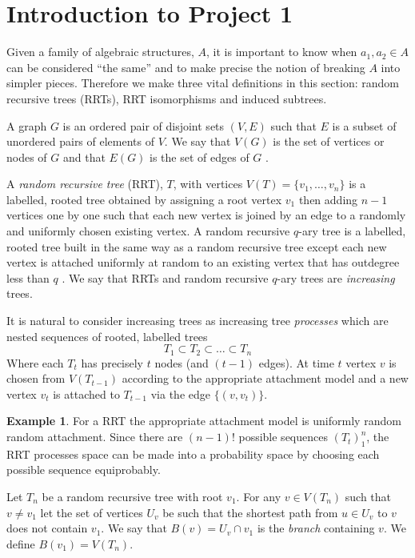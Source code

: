 \documentclass[12pt]{article} %
\theoremstyle{definition}
\newtheorem{ex}[thm]{Example}
\begin{document}
\section{Introduction to Project 1}\label{aut}

Given a family of algebraic structures, $A$, it is important to know when $a_{1},a_{2} \in A$ can be considered ``the same'' and to make precise the notion of breaking $A$ into simpler pieces. Therefore we make three vital definitions in this section: random recursive trees (RRTs), RRT isomorphisms and induced subtrees. 

A graph $G$ is an ordered pair of disjoint sets $(V,E)$ such that $E$ is a subset of unordered pairs of elements of $V$. We say that $V(G)$ is the set of vertices or nodes of $G$ and that $E(G)$ is the set of edges of $G$ \cite{Bela}.
 
A \emph{random recursive tree} (RRT), $T$, with vertices $V(T) = \{v_{1},\dots,v_{n}\}$ is a labelled, rooted tree obtained by assigning a root vertex $v_{1}$ then adding $n-1$ vertices one by one such that each new vertex is joined by an edge to a randomly and uniformly chosen existing vertex. A random recursive $q$-ary tree is a labelled, rooted tree built in the same way as a random recursive tree except each new vertex is attached uniformly at random to an existing vertex that has outdegree less than $q$ \cite{Berg}.  We say that RRTs and random recursive $q$-ary trees are \emph{increasing} trees.  

It is natural to consider increasing trees as increasing tree \emph{processes} which are nested sequences of rooted, labelled trees
\[T_{1} \subset T_{2} \subset \dots \subset T_{n}\]
Where each $T_{t}$ has precisely $t$ nodes (and $(t-1)$ edges).  At time $t$ vertex $v$ is chosen from $V(T_{t-1})$  according to the appropriate attachment model and a new vertex $v_{t}$ is attached to $T_{t-1}$ via the edge $\{(v,v_{t})\}$.

\begin{ex}
For a RRT the appropriate attachment model is uniformly random random attachment.  Since there are $(n-1)!$ possible sequences $(T_{t})_{1}^{n}$, the RRT processes space can be made into a probability space by choosing each possible sequence equiprobably. 
\end{ex}
 
Let $T_{n}$ be a random recursive tree with root $v_{1}$.  For any $ v \in V(T_{n})$ such that $ v \neq v_{1}$ let the set of vertices $U_{v}$ be such that the shortest path from $u \in U_{v}$ to $v$ does not contain $v_{1}$. We say that $B(v) = U_{v} \cap v_{1}$ is the \emph{branch} containing $v$. We define $B(v_{1}) =  V(T_{n})$.     
\end{document}
